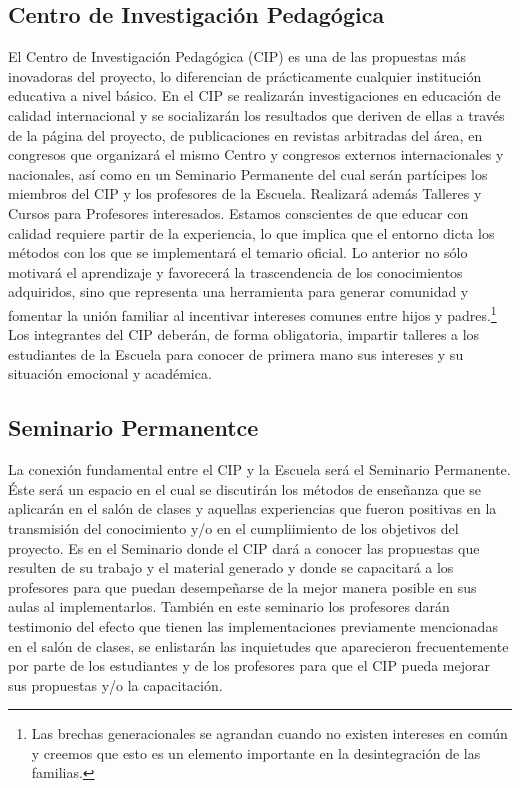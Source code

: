 \documentclass[10pt,letterpaper]{book}
\begin{document}
\subsection{Centro de Investigación Pedagógica}
El Centro de Investigación Pedagógica (CIP) es una de las propuestas más inovadoras del proyecto, lo diferencian de prácticamente cualquier institución educativa a nivel básico. En el CIP se realizarán investigaciones en educación de calidad internacional y se socializarán los resultados que deriven de ellas a través de la página del proyecto, de publicaciones en revistas arbitradas del área, en congresos que organizará el mismo Centro y congresos externos internacionales y nacionales, así como en un Seminario Permanente del cual serán partícipes los miembros del CIP y los profesores de la Escuela. Realizará además Talleres y Cursos para Profesores interesados. Estamos conscientes de que educar con calidad requiere partir de la experiencia, lo que implica que el entorno dicta los métodos con los que se implementará el temario oficial. Lo anterior no sólo motivará el aprendizaje y favorecerá la trascendencia de los conocimientos adquiridos, sino que representa una herramienta para generar comunidad y fomentar la unión familiar al incentivar intereses comunes entre hijos y padres.\footnote{Las brechas generacionales se agrandan cuando no existen intereses en común y creemos que esto es un elemento importante en la desintegración de las familias.} Los integrantes del CIP deberán, de forma obligatoria, impartir talleres a los estudiantes de la Escuela para conocer de primera mano sus intereses y su situación emocional y académica.
\subsection{Seminario Permanentce}
La conexión fundamental entre el CIP y la Escuela será el Seminario Permanente. Éste será un espacio en el cual se discutirán los métodos de enseñanza que se aplicarán en el salón de clases y aquellas experiencias que fueron positivas en la transmisión del conocimiento y/o en el cumpliimiento de los objetivos del proyecto. Es en el Seminario donde el CIP dará a conocer las propuestas que resulten de su trabajo y el material generado y donde se capacitará a los profesores para que puedan desempeñarse de la mejor manera posible en sus aulas al implementarlos. También en este seminario los profesores darán testimonio del efecto que tienen las implementaciones previamente mencionadas en el salón de clases, se enlistarán las inquietudes que aparecieron frecuentemente por parte de los estudiantes y de los profesores para que el CIP pueda mejorar sus propuestas y/o la capacitación.
\end{document}
